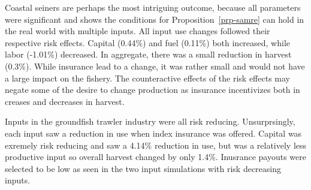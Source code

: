 \documentclass[
  super,
  preprint,
  3p]{elsarticle}
\theoremstyle{plain}
\theoremstyle{plain}
\theoremstyle{remark}
\begin{document}
Coastal seiners are perhaps the most intriguing outcome, because all
parameters were significant and shows the conditions for
Proposition~\ref{prp-samre} can hold in the real world with multiple
inputs. All input use changes followed their respective risk effects.
Capital (0.44\%) and fuel (0.11\%) both increased, while labor (-1.01\%)
decreased. In aggregate, there was a small reduction in harvest (0.3\%).
While insurance lead to a change, it was rather small and would not have
a large impact on the fishery. The counteractive effects of the risk
effects may negate some of the desire to change production as insurance
incentivizes both in creases and decreases in harvest.

Inputs in the groundfish trawler industry were all risk reducing.
Unsurprsingly, each input saw a reduction in use when index insurance
was offered. Capital was exremely risk reducing and saw a 4.14\%
reduction in use, but was a relatively less productive input so overall
harvest changed by only 1.4\%. Inusrance payouts were selected to be low
as seen in the two input simulations with risk decreasing inputs.
\end{document}
